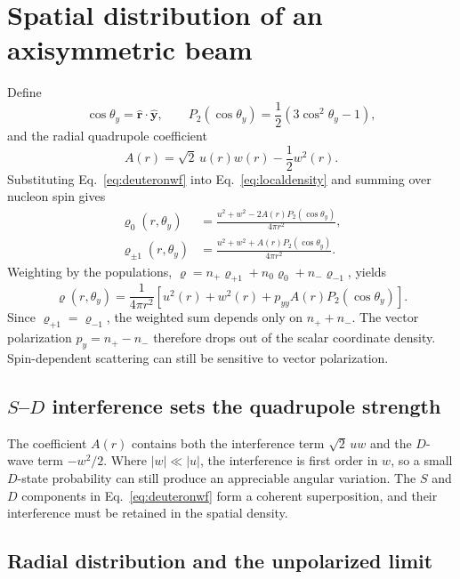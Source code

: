 \documentclass[11pt,a4paper]{article}
\begin{document}
\section{Spatial distribution of an axisymmetric beam}

Define
\[
\cos\theta_y=\hat{\bm r}\cdot\hat{\bm y},
\qquad P_2(\cos\theta_y)=\frac12(3\cos^2\theta_y-1),
\]
and the radial quadrupole coefficient
\begin{equation}
A(r)=\sqrt2\,u(r)w(r)-\frac12w^2(r).
\label{eq:A}
\end{equation}
Substituting Eq.~\eqref{eq:deuteronwf} into Eq.~\eqref{eq:localdensity}
and summing over nucleon spin gives
\begin{align}
\varrho_0(r,\theta_y)
&=\frac{u^2+w^2-2A(r)P_2(\cos\theta_y)}{4\pi r^2},
\label{eq:rho0}\\
\varrho_{\pm1}(r,\theta_y)
&=\frac{u^2+w^2+A(r)P_2(\cos\theta_y)}{4\pi r^2}.
\label{eq:rhopm}
\end{align}
Weighting by the populations,
$\varrho=n_+\varrho_{+1}+n_0\varrho_0+n_-\varrho_{-1}$, yields
\begin{equation}
\boxed{
\varrho(r,\theta_y)
=\frac{1}{4\pi r^2}
\left[u^2(r)+w^2(r)+p_{yy}A(r)P_2(\cos\theta_y)\right].
}
\label{eq:master}
\end{equation}
Since $\varrho_{+1}=\varrho_{-1}$, the weighted sum depends only on
$n_++n_-$. The vector polarization $p_y=n_+-n_-$ therefore drops out of
the scalar coordinate density. Spin-dependent scattering can still be
sensitive to vector polarization.

\subsection{\texorpdfstring{$S$--$D$}{S--D} interference sets the quadrupole strength}

The coefficient $A(r)$ contains both the interference term
$\sqrt2\,uw$ and the $D$-wave term $-w^2/2$.
Where $|w|\ll|u|$, the interference is first order in $w$, so a small
$D$-state probability can still produce an appreciable angular variation.
The $S$ and $D$ components in Eq.~\eqref{eq:deuteronwf} form a coherent
superposition, and their interference must be retained in the spatial density.

\subsection{Radial distribution and the unpolarized limit}
\end{document}
